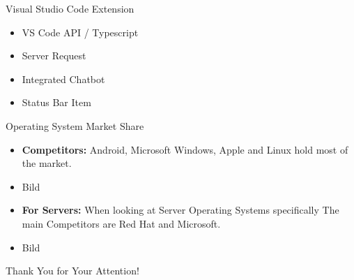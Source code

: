 \documentclass{beamer}
\begin{document}
\begin{frame}{Visual Studio Code Extension}
  \begin{itemize}
    \item VS Code API / Typescript
    \item Server Request
    \item Integrated Chatbot
    \item Status Bar Item 
  \end{itemize}
\end{frame}

\begin{frame}{Operating System Market Share} 
  \begin{itemize}
    \item \textbf{Competitors:} Android, Microsoft Windows, Apple and Linux hold most of the market.
    \item  Bild
    \item \textbf{For Servers:} When looking at Server Operating Systems specifically The main Competitors are Red Hat and Microsoft.
    \item  Bild
  \end{itemize}
\end{frame}


\begin{frame}[plain]
  
  \centering
  \vspace{1cm}
  \Huge Thank You for Your Attention!
\end{frame}
\end{document}
